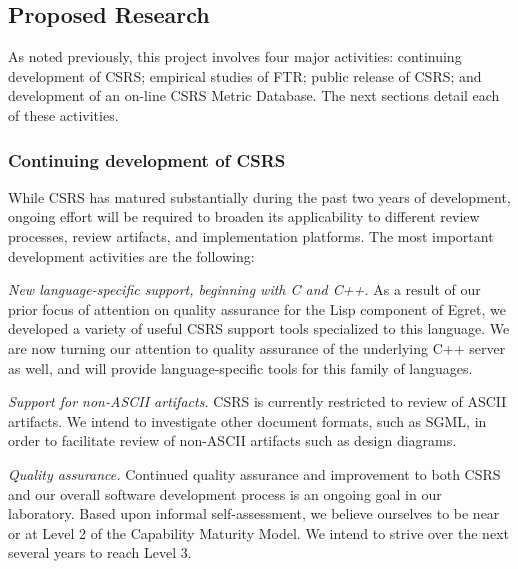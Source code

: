 
\subsection{Proposed Research}
\label{sec:proposed-research}

As noted previously, this project involves four major activities:
continuing development of CSRS; empirical studies of FTR; public release of
CSRS; and development of an on-line CSRS Metric Database.  The next sections
detail each of these activities.

\subsubsection{Continuing development of CSRS}

While CSRS has matured substantially during the past two years of
development, ongoing effort will be required to broaden its applicability
to different review processes, review artifacts, and implementation
platforms.  The most important development activities are the following:

\begin{itemizenoindent}
\item {\em New language-specific support, beginning with C and C++.} As a
  result of our prior focus of attention on quality assurance for the Lisp
  component of Egret, we developed a variety of useful CSRS support tools
  specialized to this language. We are now turning our attention to quality
  assurance of the underlying C++ server as well, and will provide
  language-specific tools for this family of languages.  

  \item {\em Support for non-ASCII artifacts.}  CSRS is currently
  restricted to review of ASCII artifacts.  We intend to investigate other
  document formats, such as SGML, in order to facilitate review of
  non-ASCII artifacts such as design diagrams.  
  
\item {\em Quality assurance.} Continued quality assurance and
  improvement to both CSRS and our overall software development process is
  an ongoing goal in our laboratory.  Based upon informal self-assessment,
  we believe ourselves to be near or at Level 2 of the Capability Maturity
  Model. We intend to strive over the next several years to reach Level 3.

\end{itemizenoindent}

